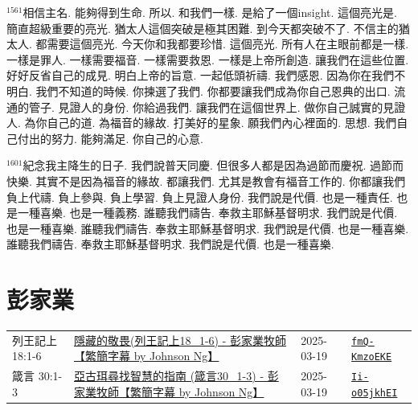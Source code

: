 \documentclass{book}
\begin{document}
$^{1561}$相信主名.
能夠得到生命.
所以.
和我們一樣.
是給了一個insight.
這個亮光是.
簡直超級重要的亮光.
猶太人這個突破是極其困難.
到今天都突破不了.
不信主的猶太人.
都需要這個亮光.
今天你和我都要珍惜.
這個亮光.
所有人在主眼前都是一樣.
一樣是罪人.
一樣需要福音.
一樣需要救恩.
一樣是上帝所創造.
讓我們在這些位置.
好好反省自己的成見.
明白上帝的旨意.
一起低頭祈禱.
我們感恩.
因為你在我們不明白.
我們不知道的時候.
你揀選了我們.
你都要讓我們成為你自己恩典的出口.
流通的管子.
見證人的身份.
你給過我們.
讓我們在這個世界上.
做你自己誠實的見證人.
為你自己的道.
為福音的緣故.
打美好的星象.
願我們內心裡面的.
思想.
我們自己付出的努力.
能夠滿足.
你自己的心意.

$^{1601}$紀念我主降生的日子.
我們說普天同慶.
但很多人都是因為過節而慶祝.
過節而快樂.
其實不是因為福音的緣故.
都讓我們.
尤其是教會有福音工作的.
你都讓我們負上代禱.
負上參與.
負上學習.
負上見證人身份.
我們說是代價.
也是一種責任.
也是一種喜樂.
也是一種義務.
誰聽我們禱告.
奉救主耶穌基督明求.
我們說是代價.
也是一種喜樂.
誰聽我們禱告.
奉救主耶穌基督明求.
我們說是代價.
也是一種喜樂.
誰聽我們禱告.
奉救主耶穌基督明求.
我們說是代價.
也是一種喜樂.
\newpage



\chapter{彭家業}\label{ch:preacher2}
\begin{multicols}{3}
\minitoc
\end{multicols}
{ \scriptsize


\begin{xltabular}{\textwidth}{|p{0.15\textwidth} p{0.6\textwidth}|p{0.07\textwidth} p{0.1\textwidth}|}
\hline
列王記上 18:1-6 & \hyperref[sec:fmQ_KmzoEKE]{隱藏的敬畏(列王記上18\_1-6) - 彭家業牧師【繁簡字幕 by Johnson Ng】} & 2025-03-19 & \href{https://youtube.com/watch?v=fmQ-KmzoEKE}{\texttt{fmQ-KmzoEKE}} \\
箴言 30:1-3 & \hyperref[sec:Ii_o05jkhEI]{亞古珥尋找智慧的指南 (箴言30\_1-3) - 彭家業牧師【繁簡字幕 by Johnson Ng】} & 2025-03-19 & \href{https://youtube.com/watch?v=Ii-o05jkhEI}{\texttt{Ii-o05jkhEI}} \\
\hline
\end{xltabular}
}
\newpage
\end{document}

